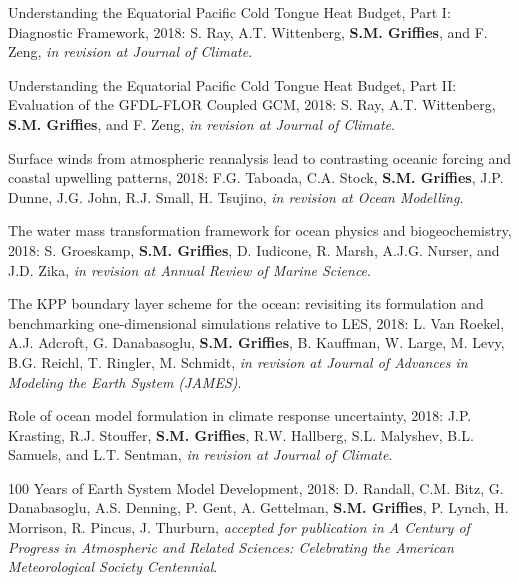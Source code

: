 \begin{etaremune}
\item Understanding the Equatorial Pacific Cold Tongue Heat Budget, Part I: Diagnostic Framework, 2018: S. Ray, A.T. Wittenberg, {\bf S.M. Griffies}, and F. Zeng, {\it in revision at Journal of Climate}.

\item Understanding the Equatorial Pacific Cold Tongue Heat Budget, Part II: Evaluation of the GFDL-FLOR Coupled GCM, 2018: S. Ray, A.T. Wittenberg, {\bf S.M. Griffies}, and F. Zeng, {\it in revision at Journal of Climate}.

\item Surface winds from atmospheric reanalysis lead to contrasting oceanic forcing and coastal upwelling patterns, 2018: F.G. Taboada, C.A. Stock, {\bf S.M. Grif\/f\/ies}, J.P. Dunne, J.G. John, R.J. Small, H. Tsujino, {\it in revision at Ocean Modelling}.

\item The water mass transformation framework for ocean physics and biogeochemistry, 2018: S. Groeskamp, {\bf S.M. Grif\/f\/ies}, D. Iudicone,  R. Marsh, A.J.G. Nurser, and J.D. Zika, {\it in revision at Annual Review of Marine Science}.

\item The KPP boundary layer scheme for the ocean: revisiting its formulation and benchmarking one-dimensional simulations relative to LES,  2018: L. Van Roekel, A.J.  Adcroft, G. Danabasoglu, {\bf S.M. Grif\/f\/ies}, B. Kauffman, W. Large, M. Levy, B.G. Reichl, T. Ringler, M. Schmidt, {\it in revision at Journal of Advances in Modeling the Earth System (JAMES)}.

\item Role of ocean model formulation in climate response uncertainty, 2018: J.P. Krasting, R.J. Stouffer, {\bf S.M. Grif\/f\/ies}, R.W. Hallberg, S.L. Malyshev, B.L. Samuels, and L.T. Sentman, {\it in revision at Journal of Climate}.

\item 100 Years of Earth System Model Development, 2018: D. Randall, C.M. Bitz, G. Danabasoglu, A.S. Denning, P. Gent, A. Gettelman, {\bf S.M. Grif\/f\/ies}, P. Lynch, H. Morrison, R. Pincus, J. Thurburn, {\it accepted for publication in A Century of Progress in Atmospheric and Related Sciences: Celebrating the American Meteorological Society Centennial}.   
       


\end{etaremune}



